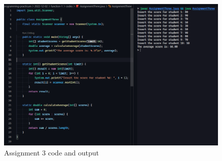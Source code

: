 \documentclass[12pt,titlepage]{article}
\begin{document}
\begin{enumerate}
{        \begin{figure}[h]
            \centering
            \includegraphics[width=.8\textwidth]{./images/assignment-three.png}
            \caption{Assignment 3 code and output}
        \end{figure}
    }
\end{enumerate}
\end{document}

